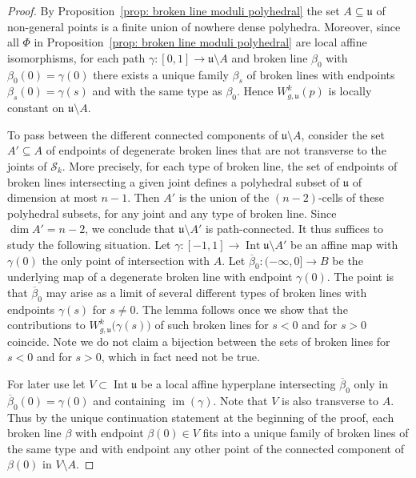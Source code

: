 \documentclass[11pt,letter]{amsart}
\theoremstyle{definition}
\theoremstyle{remark}
\numberwithin{equation}{section}
\numberwithin{figure}{section}
\newcommand {\fou}  {\mathfrak{u}}
\newcommand {\im}  {\operatorname{im}}
\newcommand {\Int}  {\operatorname{Int}}
\newcommand {\ol} {\overline}
\newcommand {\scrS}  {\mathscr{S}}
\begin{document}
\begin{proof}
By Proposition~\ref{prop: broken line moduli polyhedral} the set $A \subseteq
\fou$ of non-general points is a finite union of nowhere dense polyhedra.
Moreover, since all $\Phi$ in Proposition~\ref{prop: broken line moduli
polyhedral} are local affine isomorphisms, for each path $\gamma: [0,1]\to
\fou\setminus A$ and broken line $\beta_0$ with $\beta_0(0)= \gamma(0)$ there
exists a unique family $\beta_s$ of broken lines with endpoints
$\beta_s(0)=\gamma(s)$ and with the same type as $\beta_0$. Hence
$W^k_{g,\fou}(p)$ is locally constant on $\fou\setminus A$.

To pass between the different connected components of $\fou\setminus A$,
consider the set $A'\subseteq A$ of endpoints of degenerate broken lines that
are not transverse to the joints of $\scrS_k$. More precisely, for each type of
broken line, the set of endpoints of broken lines intersecting a given joint
defines a polyhedral subset of $\fou$ of dimension at most $n-1$. Then $A'$ is
the union of the $(n-2)$-cells of these polyhedral subsets, for any joint and
any type of broken line. Since $\dim A'= n-2$, we conclude that $\fou\setminus
A'$ is path-connected. It thus suffices to study the following situation. Let
$\gamma:[-1,1]\to \Int \fou\setminus A'$ be an affine map with $\gamma(0)$ the
only point of intersection with $A$. Let $\overline\beta_0: (-\infty,0]\to B$ be
the underlying map of a degenerate broken line with endpoint $\gamma(0)$. The
point is that $\overline\beta_0$ may arise as a limit of several different types
of broken lines with endpoints $\gamma(s)$ for $s\neq0$. The lemma follows once
we show that the contributions to $W^k_{g,\fou} \big(\gamma(s)\big)$ of such
broken lines for $s<0$ and for $s>0$ coincide. Note we do not claim a bijection
between the sets of broken lines for $s<0$ and for $s>0$, which in fact need not
be true.

For later use let $V\subset \Int\fou$ be a local affine hyperplane intersecting
$\ol\beta_0$ only in $\ol\beta_0(0)=\gamma(0)$ and containing $\im(\gamma)$.
Note that $V$ is also transverse to $A$. Thus by the unique continuation
statement at the beginning of the proof, each broken line $\beta$ with endpoint
$\beta(0)\in V$ fits into a unique family of broken lines of the same type and
with endpoint any other point of the connected component of $\beta(0)$ in
$V\setminus A$.


\end{proof}
\end{document}
